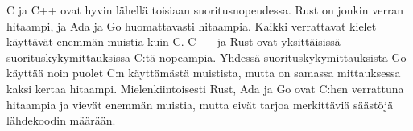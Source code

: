 C ja C++ ovat hyvin lähellä toisiaan suoritusnopeudessa. Rust on jonkin verran
hitaampi, ja Ada ja Go huomattavasti hitaampia. Kaikki verrattavat kielet
käyttävät enemmän muistia kuin C. C++ ja Rust ovat yksittäisissä
suorituskykymittauksissa C:tä nopeampia. Yhdessä suorituskykymittauksista Go
käyttää noin puolet C:n käyttämästä muistista, mutta on samassa mittauksessa
kaksi kertaa hitaampi. Mielenkiintoisesti Rust, Ada ja Go ovat C:hen verrattuna
hitaampia ja vievät enemmän muistia, mutta eivät tarjoa merkittäviä säästöjä
lähdekoodin määrään.
